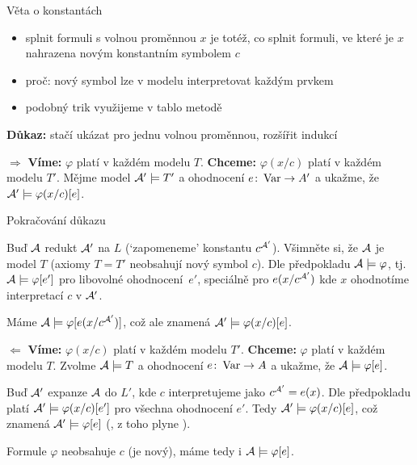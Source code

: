 \documentclass{beamer}
\begin{document}
\begin{frame}{Věta o konstantách}

    \begin{itemize}
        \item splnit formuli s volnou proměnnou $x$ je totéž, co splnit formuli, ve které je $x$ nahrazena \alert{novým} konstantním symbolem $c$
        \item proč: nový symbol lze v modelu interpretovat každým prvkem
        \item podobný trik využijeme v tablo metodě
    \end{itemize}


    \textbf{Důkaz:} stačí ukázat pro jednu volnou proměnnou, rozšířit indukcí

    \alert{\Large \bf $\Rightarrow$} \textbf{Víme:} $\varphi$ platí v každém modelu $T$. \textbf{Chceme:} $\varphi(x/c)$ platí v každém modelu $T'$. Mějme model $\mathcal{A}'\models T'$ a ohodnocení $e\colon\operatorname{Var}\to A'$ a ukažme, že \alert{$\mathcal{A}'\models\varphi(x/c)[e]$}.

\end{frame}


\begin{frame}{Pokračování důkazu}

    Buď $\mathcal{A}$ redukt $\mathcal{A}'$ na $L$ (`zapomeneme' konstantu $c^{\mathcal{A}'}$). Všimněte si, že \alert{$\mathcal{A}$ je model $T$} (axiomy $T=T'$ neobsahují \alert{nový} symbol $c$). Dle předpokladu $\mathcal{A}\models\varphi$, tj. $\mathcal{A}\models\varphi[e']$ pro \alert{libovolné} ohodnocení~$e'$, speciálně pro $e(x/c^{\mathcal{A}'})$ kde $x$ ohodnotíme  interpretací $c$ v $\mathcal{A}'$.
    
    Máme $\mathcal{A}\models\varphi[e(x/c^{\mathcal{A}'})]$, což ale znamená $\mathcal{A}'\models\varphi(x/c)[e]$.
    
    \alert{\Large \bf $\Leftarrow$} \textbf{Víme:} $\varphi(x/c)$ platí v každém modelu $T'$. \textbf{Chceme:} $\varphi$ platí v každém modelu $T$. Zvolme $\mathcal{A}\models T$ a ohodnocení $e\colon\operatorname{Var}\to A$ a ukažme, že \alert{$\mathcal{A}\models\varphi[e]$}.

    Buď $\mathcal{A}'$ expanze $\mathcal{A}$ do $L'$, kde $c$ interpretujeme jako $c^{\mathcal{A}'}=e(x)$. Dle předpokladu platí $\mathcal{A}'\models\varphi(x/c)[e']$ pro všechna ohodnocení $e'$. Tedy $\mathcal{A}'\models\varphi(x/c)[e]$, což znamená \alert{$\mathcal{A}'\models\varphi[e]$} (, z toho plyne ).
    
    Formule $\varphi$ neobsahuje $c$ (je \alert{nový}), máme tedy i $\mathcal{A}\models\varphi[e]$. \hfill\qedsymbol
    
\end{frame}
\end{document}
